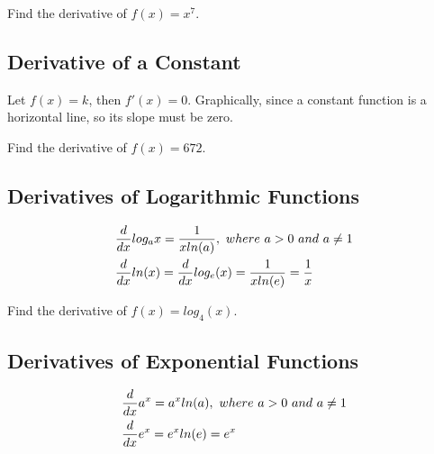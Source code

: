 \begin{exercise}\nonumber
    Find the derivative of $ f(x) = x^7 $.

    \vspace{1cm}
\end{exercise}

\subsection{Derivative of a Constant}

\begin{theorem}
    Let $ f(x) = k $, then $ f'(x) = 0 $. Graphically, since a constant function is a horizontal line, so its slope must be zero.
\end{theorem}

\begin{exercise}\nonumber
    Find the derivative of $ f(x) = 672 $.

    \vspace{1cm}
\end{exercise}

\subsection{Derivatives of Logarithmic Functions}

\begin{theorem}
    \begin{align}
         & {d \over dx}log_a{x} = {1 \over xln(a)},\ where\ a > 0\ and\ a \neq 1     \\
         & {d \over dx}ln(x) = {d \over dx}log_e(x) = {1 \over xln(e)} = {1 \over x}
    \end{align}
\end{theorem}

\begin{exercise}\nonumber
    Find the derivative of $ f(x) = log_4(x) $.

    \vspace{1cm}
\end{exercise}

\subsection{Derivatives of Exponential Functions}

\begin{theorem}
    \begin{align}
         & {d \over dx}a^x = a^xln(a),\ where\ a > 0\ and\ a \neq 1 \\
         & {d \over dx}e^x = e^xln(e) = e^x
    \end{align}
\end{theorem}

